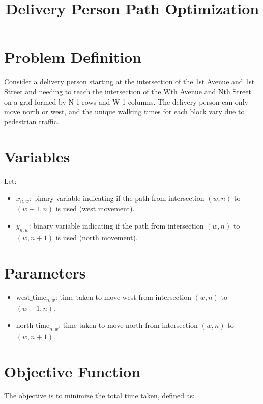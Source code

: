 \documentclass{article}
\begin{document}
\title{Delivery Person Path Optimization}
\author{}
\date{}
\maketitle

\section{Problem Definition}

Consider a delivery person starting at the intersection of the 1st Avenue and 1st Street and needing to reach the intersection of the Wth Avenue and Nth Street on a grid formed by N-1 rows and W-1 columns. The delivery person can only move north or west, and the unique walking times for each block vary due to pedestrian traffic.

\section{Variables}

Let:
\begin{itemize}
    \item \( x_{n,w} \): binary variable indicating if the path from intersection \((w, n)\) to \((w+1, n)\) is used (west movement).
    \item \( y_{n,w} \): binary variable indicating if the path from intersection \((w, n)\) to \((w, n+1)\) is used (north movement).
\end{itemize}

\section{Parameters}

\begin{itemize}
    \item \( \text{west\_time}_{n,w} \): time taken to move west from intersection \((w, n)\) to \((w+1, n)\).
    \item \( \text{north\_time}_{n,w} \): time taken to move north from intersection \((w, n)\) to \((w, n+1)\).
\end{itemize}

\section{Objective Function}

The objective is to minimize the total time taken, defined as:
\end{document}
